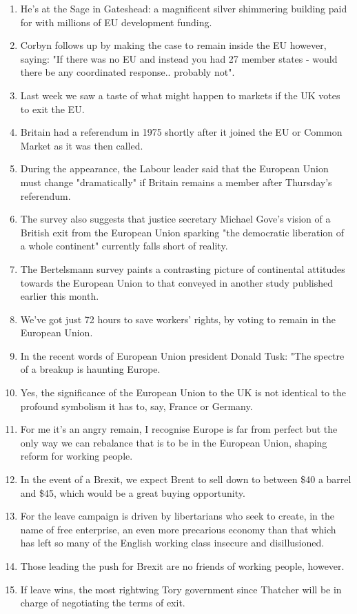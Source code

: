 \documentclass[fleqn,moreauthors,10pt]{ds_report}
\begin{document}
\begin{enumerate}
    \item He's at the Sage in Gateshead: a magnificent silver shimmering building paid for with millions of  EU	development funding.
    \item Corbyn follows up by making the case to remain inside the EU however, saying: "If there was no EU and instead you had 27 member states - would there be any coordinated response.. probably not".
    \item Last week we saw a taste of what might happen to markets if the UK votes to exit the EU.
    \item Britain had a referendum in 1975 shortly after it joined the EU or Common Market as it was then called.
    \item During the appearance, the Labour leader said that the European Union must change "dramatically" if Britain remains a member after Thursday's referendum.
    \item The survey also suggests that justice secretary Michael Gove's vision of a British exit from the European Union sparking "the democratic liberation of a whole continent" currently falls short of reality.
    \item The Bertelsmann survey paints a contrasting picture of continental attitudes towards the European Union to that conveyed in another study published earlier this month.
    \item We've got just 72 hours to save workers' rights, by voting to remain in the	European Union.
    \item In the recent words of European Union president Donald Tusk: "The spectre of a breakup is haunting Europe.
    \item Yes, the significance of the European Union to the UK is not identical to the profound symbolism it has to, say, France or Germany.
    \item For me it's an angry remain, I recognise Europe is far from perfect but the only way we can rebalance that is to be in the European Union, shaping reform for working people.
    \item In the event of a Brexit, we expect Brent to sell down to between \$40 a barrel and \$45, which would be a great buying opportunity.
    \item For the leave campaign is driven by libertarians who seek to create, in the name of free enterprise, an even more precarious economy than that which has left so many of the English working class insecure and disillusioned.
    \item Those leading the push for Brexit are no friends of working people, however.
    \item If leave wins, the most rightwing Tory government since Thatcher will be in charge of negotiating the terms of exit.
\end{enumerate}
\end{document}

